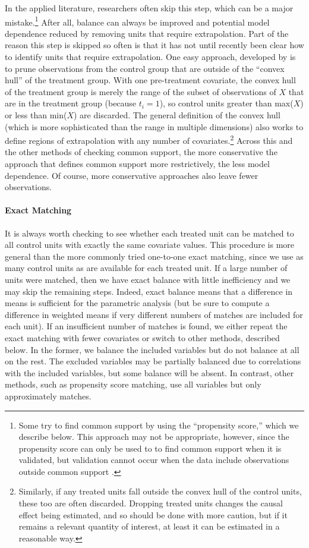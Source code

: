 \documentclass[11pt,titlepage]{article}
\begin{document}
In the applied literature, researchers often skip this step, which can
be a major mistake.\footnote{Some try to find common support by using
  the ``propensity score,'' which we describe below.  This approach
  may not be appropriate, however, since the propensity score can only
  be used to to find common support when it is validated, but
  validation cannot occur when the data include observations outside
  common support \citep[see][and the discussion below]{KinZen06a}.}
After all, balance can always be improved and potential model
dependence reduced by removing units that require extrapolation.  Part
of the reason this step is skipped so often is that it has not until
recently been clear how to identify units that require extrapolation.
One easy approach, developed by \citet{KinZen06a} is to prune
observations from the control group that are outside of the ``convex
hull'' of the treatment group.  With one pre-treatment covariate, the
convex hull of the treatment group is merely the range of the subset
of observations of $X$ that are in the treatment group (because
$t_i=1$), so control units greater than max($X$) or less than min($X$)
are discarded.  The general definition of the convex hull (which is
more sophisticated than the range in multiple dimensions) also works
to define regions of extrapolation with any number of
covariates.\footnote{Similarly, if any treated units fall outside the
  convex hull of the control units, these too are often discarded.
  Dropping treated units changes the causal effect being estimated,
  and so should be done with more caution, but if it remains a
  relevant quantity of interest, at least it can be estimated in a
  reasonable way.}  Across this and the other methods of checking
common support, the more conservative the approach that defines common
support more restrictively, the less model dependence.  Of course,
more conservative approaches also leave fewer observations.

\paragraph{Exact Matching}  
It is always worth checking to see whether each treated unit can be
matched to all control units with exactly the same covariate values.
This procedure is more general than the more commonly tried one-to-one
exact matching, since we use as many control units as are available
for each treated unit.  If a large number of units were matched, then
we have exact balance with little inefficiency and we may skip the
remaining steps.  Indeed, exact balance means that a difference in
means is sufficient for the parametric analysis (but be sure to
compute a difference in weighted means if very different numbers of
matches are included for each unit).  If an insufficient number of
matches is found, we either repeat the exact matching with fewer
covariates or switch to other methods, described below.  In the
former, we balance the included variables but do not balance at all on
the rest.  The excluded variables may be partially balanced due to
correlations with the included variables, but some balance will be
absent.  In contrast, other methods, such as propensity score
matching, use all variables but only approximately matches.
\end{document}
